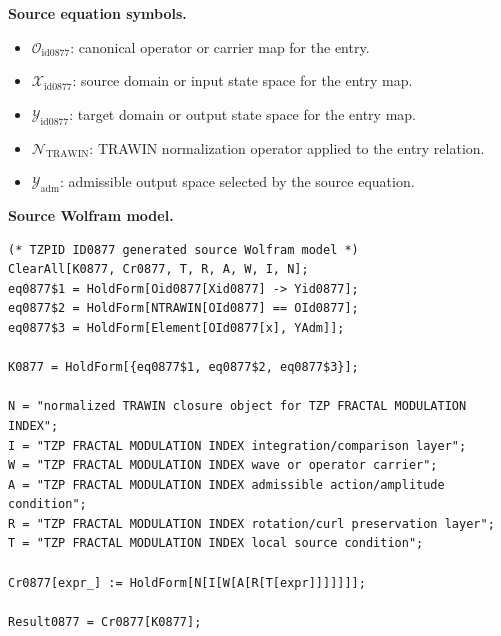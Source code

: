\begin{minipage}[t]{0.49\linewidth}
\begingroup
\small
\raggedright
\textbf{Source equation symbols.}\par
\begin{itemize}[leftmargin=1.35em,itemsep=1pt,topsep=1pt,parsep=0pt]
    \item $\mathcal{O}_{\mathrm{id0877}}$: canonical operator or carrier map for the entry.
    \item $\mathcal{X}_{\mathrm{id0877}}$: source domain or input state space for the entry map.
    \item $\mathcal{Y}_{\mathrm{id0877}}$: target domain or output state space for the entry map.
    \item $\mathcal{N}_{\mathrm{TRAWIN}}$: TRAWIN normalization operator applied to the entry relation.
    \item $\mathcal{Y}_{\mathrm{adm}}$: admissible output space selected by the source equation.
\end{itemize}
\endgroup
\end{minipage}\hfill
\begin{minipage}[t]{0.47\linewidth}
\begingroup
\scriptsize
\raggedright
\textbf{Source Wolfram model.}\par
\begin{Verbatim}[fontsize=\tiny,breaklines=true,breakanywhere=true]
(* TZPID ID0877 generated source Wolfram model *)
ClearAll[K0877, Cr0877, T, R, A, W, I, N];
eq0877$1 = HoldForm[Oid0877[Xid0877] -> Yid0877];
eq0877$2 = HoldForm[NTRAWIN[OId0877] == OId0877];
eq0877$3 = HoldForm[Element[OId0877[x], YAdm]];

K0877 = HoldForm[{eq0877$1, eq0877$2, eq0877$3}];

N = "normalized TRAWIN closure object for TZP FRACTAL MODULATION INDEX";
I = "TZP FRACTAL MODULATION INDEX integration/comparison layer";
W = "TZP FRACTAL MODULATION INDEX wave or operator carrier";
A = "TZP FRACTAL MODULATION INDEX admissible action/amplitude condition";
R = "TZP FRACTAL MODULATION INDEX rotation/curl preservation layer";
T = "TZP FRACTAL MODULATION INDEX local source condition";

Cr0877[expr_] := HoldForm[N[I[W[A[R[T[expr]]]]]]];

Result0877 = Cr0877[K0877];
\end{Verbatim}
\endgroup
\end{minipage}

